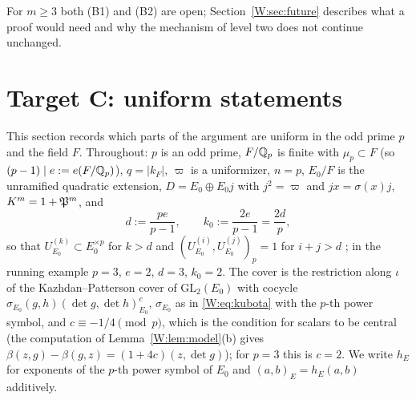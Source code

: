 For $m\ge3$ both (B1) and (B2) are open; Section~\ref{W:sec:future}
describes what a proof would need and why the mechanism of level two
does not continue unchanged.

\section{Target C: uniform statements}\label{W:sec:targetC}
This section records which parts of the argument are uniform in the
odd prime $p$ and the field $F$.  Throughout: $p$ is an odd prime,
$F/\mathbb Q_p$ is finite with $\mu_p\subset F$ (so $(p-1)\mid e:=e(F/\mathbb Q_p)$),
$q=|k_F|$, $\varpi$ is a uniformizer, $n=p$, $E_0/F$ is the unramified
quadratic extension, $D=E_0\oplus E_0j$ with $j^2=\varpi$ and
$jx=\sigma(x)j$, $K^m=1+\mathfrak P^m$, and
\begin{equation}\label{W:eq:dgen}
 d:=\frac{pe}{p-1},\qquad k_0:=\frac{2e}{p-1}=\frac{2d}{p},
\end{equation}
so that $U^{(k)}_{E_0}\subset E_0^{\times p}$ for $k>d$ and
$(U^{(i)}_{E_0},U^{(j)}_{E_0})_p=1$ for $i+j>d$ \cite[Ch.~IV]{FV02}; in the
running example $p=3$, $e=2$, $d=3$, $k_0=2$.  The cover is the
restriction along $\iota$ of the Kazhdan--Patterson cover of
$\mathrm{GL}_2(E_0)$ with cocycle $\sigma_{E_0}(g,h)(\det g,\det h)^{c}_{E_0}$,
$\sigma_{E_0}$ as in \eqref{W:eq:kubota} with the $p$-th power symbol,
and $c\equiv-1/4\pmod p$, which is the condition for scalars to be
central (the computation of Lemma~\ref{W:lem:model}(b) gives
$\beta(z,g)-\beta(g,z)=(1+4c)(z,\det g)$); for $p=3$ this is $c=2$.  We
write $h_E$ for exponents of the $p$-th power symbol of $E_0$ and
$(a,b)_E=h_E(a,b)$ additively.

